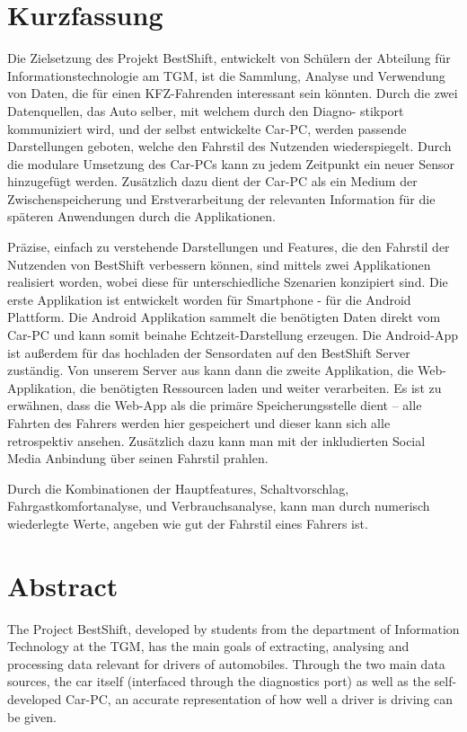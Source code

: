 \section*{Kurzfassung} 

Die Zielsetzung des Projekt BestShift, entwickelt von Schülern der Abteilung für Informationstechnologie am TGM, ist die Sammlung, Analyse und Verwendung von Daten, die für einen KFZ-Fahrenden interessant sein könnten. Durch die zwei Datenquellen, das Auto selber, mit welchem durch den Diagno- stikport kommuniziert wird, und der selbst entwickelte Car-PC, werden passende Darstellungen geboten, welche den Fahrstil des Nutzenden wiederspiegelt. 
Durch die modulare Umsetzung des Car-PCs kann zu jedem Zeitpunkt ein neuer Sensor hinzugefügt werden. Zusätzlich dazu dient der Car-PC als ein Medium der Zwischenspeicherung und Erstverarbeitung der relevanten Information für die späteren Anwendungen durch die Applikationen. 

Präzise, einfach zu verstehende Darstellungen und Features, die den Fahrstil der Nutzenden von BestShift verbessern können, sind mittels zwei Applikationen realisiert worden, wobei diese für unterschiedliche Szenarien konzipiert sind. Die erste Applikation ist entwickelt worden für Smartphone - für die Android Plattform. Die Android Applikation sammelt die benötigten Daten direkt vom Car-PC und kann somit beinahe Echtzeit-Darstellung erzeugen. Die Android-App ist außerdem für das hochladen der Sensordaten auf den BestShift Server zuständig. Von unserem Server aus kann dann die zweite Applikation, die Web-Applikation, die benötigten Ressourcen laden und weiter verarbeiten. Es ist zu erwähnen, dass die Web-App als die primäre Speicherungsstelle dient – alle Fahrten des Fahrers werden hier gespeichert und dieser kann sich alle retrospektiv ansehen. Zusätzlich dazu kann man mit der inkludierten Social Media Anbindung über seinen Fahrstil prahlen. 

Durch die Kombinationen der Hauptfeatures, Schaltvorschlag, Fahrgastkomfortanalyse, und Verbrauchsanalyse, kann man durch numerisch wiederlegte Werte, angeben wie gut der Fahrstil eines Fahrers ist.

\section*{Abstract} 

The Project BestShift, developed by students from the department of Information Technology at the TGM, has the main goals of extracting, analysing and processing data relevant for drivers of automobiles. Through the two main data sources, the car itself (interfaced through the diagnostics port) as well as the self-developed Car-PC, an accurate representation of how well a driver is driving can be given.

